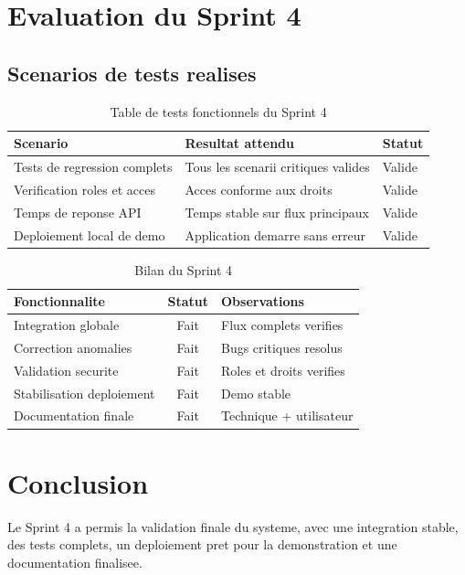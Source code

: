 \documentclass[a4paper,12pt]{report}
\begin{document}
\section{Evaluation du Sprint 4}

\subsection{Scenarios de tests realises}

\begin{table}[H]
  \centering
  \caption{Table de tests fonctionnels du Sprint 4}
  \label{tab:tests_s4}
  \begin{tabular}{|p{5.2cm}|p{3.2cm}|p{5.4cm}|}
    \hline
    \textbf{Scenario} & \textbf{Resultat attendu} & \textbf{Statut} \\
    \hline
    Tests de regression complets & Tous les scenarii critiques valides & Valide \\
    \hline
    Verification roles et acces & Acces conforme aux droits & Valide \\
    \hline
    Temps de reponse API & Temps stable sur flux principaux & Valide \\
    \hline
    Deploiement local de demo & Application demarre sans erreur & Valide \\
    \hline
  \end{tabular}
\end{table}

\begin{table}[H]
  \centering
  \caption{Bilan du Sprint 4}
  \label{tab:bilan_s4}
  \begin{tabular}{|p{5cm}|c|p{6.5cm}|}
    \hline
    \textbf{Fonctionnalite} & \textbf{Statut} & \textbf{Observations} \\
    \hline
    Integration globale & Fait & Flux complets verifies \\
    \hline
    Correction anomalies & Fait & Bugs critiques resolus \\
    \hline
    Validation securite & Fait & Roles et droits verifies \\
    \hline
    Stabilisation deploiement & Fait & Demo stable \\
    \hline
    Documentation finale & Fait & Technique + utilisateur \\
    \hline
  \end{tabular}
\end{table}

\section*{Conclusion}

Le Sprint 4 a permis la validation finale du systeme, avec une integration
stable, des tests complets, un deploiement pret pour la demonstration et une
documentation finalisee.

\clearpage

\end{document}

